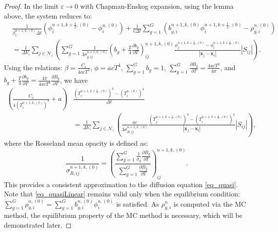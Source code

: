 \documentclass[preprint,12pt]{elsarticle}
\theoremstyle{definition}
\theoremstyle{plain}
\numberwithin{equation}{section}
\numberwithin{algorithm}{section}
\newcounter{eq_count}
\newcommand{\half}{\frac{1}{2}}
\newcommand{\vr}{\mathbf{x}}
\newcommand{\pdrv}[2]{\frac{\partial{#1}}{\partial{#2}}}
\begin{document}
\begin{proof}
    In the limit  $\varepsilon \rightarrow 0$ with Chapman-Enskog expansion, using the lemma above, the system reduces to:
        \begin{equation}
\begin{aligned}
    &\frac{1}{\beta_i^{n+1,k,(0)} \Delta t} (\phi_i^{n+1,k+\frac{1}{2},(0)} - \phi_i^{n,(0)})
    + \frac{1}{c \Delta t} \sum_{g=1}^G \left(  b_{g,i}^{n+1, k,(0)}    \phi_i^{n+1,k+\frac{1}{2},(0)} - \rho_{g,i}^{n,(0)} \right)
    \\
    &=    \frac{1}{ \Delta  V_i } \sum_{j \in \mathcal{N}_i}  \left(     \sum_{g=1}^G \frac{1 }{3\sigma_{g,ij}^{n+1,k,(0)}} (b_g + \frac{T}{4} \pdrv{b_g}{T})_{ij}^{n+1,k,(0)} \frac{\phi_{j}^{n+1,k+\half,(0)} - \phi_i^{n+1,k+\half,(0)}}{ |\vr_j - \vr_i| }|S_{ij}|    \right).
\end{aligned}
\end{equation}
Using the relations: $\beta = \frac{C_v}{4 a c T^3}$, $\phi = ac T^4$, $\sum_{g=1}^G b_g = 1$, $\sum_{g=1}^G \pdrv{B_g}{T} = \frac{4acT^3 }{4\pi}$, and $b_g + \frac{T}{4} \pdrv{b_g}{T} = \frac{4 \pi}{4acT^3}\pdrv{B_g}{T}$, we have 
\begin{equation} \label{eq_quasiLinear}
	\begin{aligned}
		\left(\frac{C_v}{4 \left(T_i^{n+1,k,(0)}\right)^3} +  a\right) &\frac{\left(T_i^{n+1,k+\frac{1}{2},(0)}\right)^4 - \left(T_i^{n,(0)}\right)^4  }{\Delta t}
		\\
		&=    \frac{1}{ \Delta  V_i } \sum_{j \in \mathcal{N}_i}  \left( \frac{ac }{3\sigma_{R,ij}^{n+1,k,(0)}}  \frac{\left(T_j^{n+1,k+\frac{1}{2},(0)}\right)^4 - \left(T_i^{n+1,k+\frac{1}{2},(0)}\right)^4 }{ |\vr_j - \vr_i| }|S_{ij}|    \right),
	\end{aligned}
\end{equation}
where the Rosseland mean opacity is defined as:
\begin{equation*}
	\frac{1}{\sigma_{R,ij}^{n+1,k,(0)}}= \left( \frac{\sum_{g=1}^{G} \frac{1}{\sigma_g} \pdrv{B_g}{T} }{\sum_{g=1}^{G} \pdrv{B_g}{T} } \right)^{n+1,k,(0)}_{ij}.
\end{equation*}
This provides a consistent approximation to the diffusion equation \eqref{eq_quasi}.   Note that \eqref{eq_quasiLinear} remains valid only when the equilibrium condition: $\sum_{g=1}^{G} \rho_{g,i}^{n,(0)}  = \sum_{g=1}^{G} b_{g,i}^{n,(0)}\phi_{i}^{n,(0)}$ is satisfied. As $\rho_{g,i}^{n}$ is computed via the MC method, the equilibrium property of the MC method is necessary, which will be demonstrated later.


\end{proof}
\end{document}
